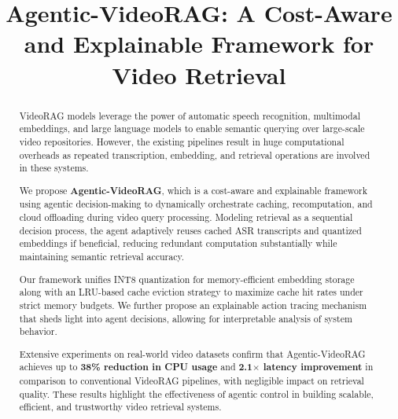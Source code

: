 \documentclass[conference,twocolumn]{IEEEtran}
\begin{document}
\title{Agentic-VideoRAG: A Cost-Aware and Explainable Framework for Video Retrieval}

\author{
\and
{}
}


\maketitle
\thispagestyle{firstpage}

\begin{abstract}
VideoRAG models leverage the power of automatic speech recognition, multimodal embeddings, and large language models to enable semantic querying over large-scale video repositories. However, the existing pipelines result in huge computational overheads as repeated transcription, embedding, and retrieval operations are involved in these systems.

We propose \textbf{Agentic-VideoRAG}, which is a cost-aware and explainable framework using agentic decision-making to dynamically orchestrate caching, recomputation, and cloud offloading during video query processing. Modeling retrieval as a sequential decision process, the agent adaptively reuses cached ASR transcripts and quantized embeddings if beneficial, reducing redundant computation substantially while maintaining semantic retrieval accuracy.

Our framework unifies INT8 quantization for memory-efficient embedding storage along with an LRU-based cache eviction strategy to maximize cache hit rates under strict memory budgets. We further propose an explainable action tracing mechanism that sheds light into agent decisions, allowing for interpretable analysis of system behavior.

Extensive experiments on real-world video datasets confirm that Agentic-VideoRAG achieves up to \textbf{38\% reduction in CPU usage} and \textbf{2.1$\times$ latency improvement} in comparison to conventional VideoRAG pipelines, with negligible impact on retrieval quality. These results highlight the effectiveness of agentic control in building scalable, efficient, and trustworthy video retrieval systems.
\end{abstract}
\end{document}
